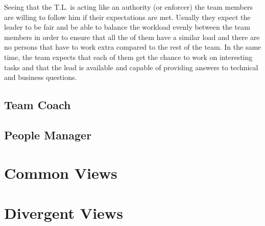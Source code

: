 Seeing that the T.L. is acting like an authority (or enforcer) the team members are willing to follow him if their expectations are met. Usually they expect the leader to be fair and be able to balance the workload evenly between the team members in order to ensure that all the of them have a similar load and there are no persons that have to work extra compared to the rest of the team. In the same time, the team expects that each of them get the chance to work on interesting tasks and that the lead is available and capable of providing answers to technical and business questions.

\subsection{Team Coach}
\label{sub-sec:team-coach}
\subsection{People Manager}
\label{sub-sec:pm}
\section{Common Views}
\label{sec:common}
\section{Divergent Views}
\label{sec:divergent}
